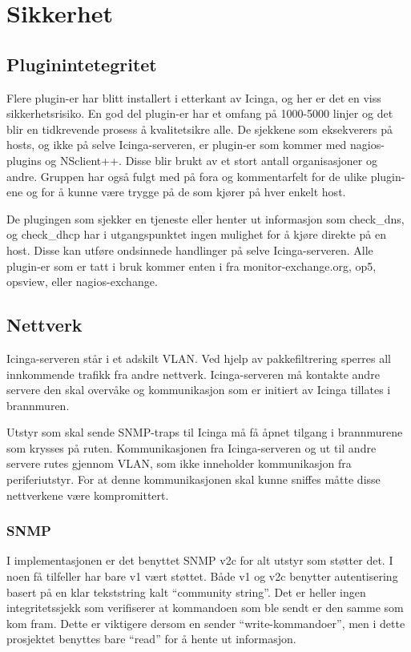 \section{Sikkerhet}
\subsection{Pluginintetegritet}
Flere plugin-er har blitt installert i etterkant av Icinga, og her er det en viss sikkerhetsrisiko. En god del plugin-er har et omfang på 1000-5000 linjer og det blir en tidkrevende prosess å kvalitetsikre alle. De sjekkene som eksekverers på hosts, og ikke på selve Icinga-serveren, er plugin-er som kommer med nagios-plugins og NSclient++. Disse blir brukt av et stort antall organisasjoner og andre. Gruppen har også fulgt med på fora og kommentarfelt for de ulike plugin-ene og for å kunne være trygge på de som kjører på hver enkelt host. 

De plugingen som sjekker en tjeneste eller henter ut informasjon som check\_dns, og check\_dhcp har i utgangspunktet ingen mulighet for å kjøre direkte på en host. Disse kan utføre ondsinnede handlinger på selve Icinga-serveren. Alle plugin-er som er tatt i bruk kommer enten i fra monitor-exchange.org, op5, opsview, eller nagios-exchange.
\subsection{Nettverk}
Icinga-serveren står i et adskilt VLAN. Ved hjelp av pakkefiltrering sperres all innkommende trafikk fra andre nettverk. Icinga-serveren må kontakte andre servere den skal overvåke og kommunikasjon som er initiert av Icinga tillates i brannmuren. 

Utstyr som skal sende SNMP-traps til Icinga må få åpnet tilgang i brannmurene som krysses på ruten. Kommunikasjonen fra Icinga-serveren og ut til andre servere rutes gjennom VLAN, som ikke inneholder kommunikasjon fra periferiutstyr. For at denne kommunikasjonen skal kunne sniffes måtte disse nettverkene være kompromittert.
\subsubsection{SNMP}
I implementasjonen er det benyttet SNMP v2c for alt utstyr som støtter det. I noen få tilfeller har bare v1 vært støttet. Både v1 og v2c benytter autentisering basert på en klar tekststring kalt “community string”. Det er heller ingen integritetssjekk som verifiserer at kommandoen som ble sendt er den samme som kom fram. Dette er viktigere dersom en sender “write-kommandoer”, men i dette prosjektet benyttes bare “read” for å hente ut informasjon.

